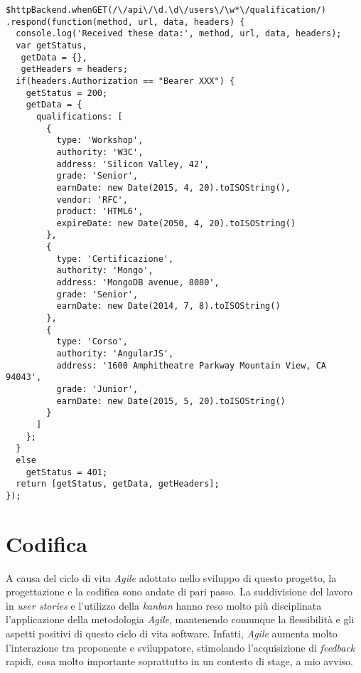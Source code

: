 \begin{verbatim}
$httpBackend.whenGET(/\/api\/\d.\d\/users\/\w*\/qualification/)
.respond(function(method, url, data, headers) {
  console.log('Received these data:', method, url, data, headers);
  var getStatus,
   getData = {},
   getHeaders = headers;
  if(headers.Authorization == "Bearer XXX") {
    getStatus = 200;
    getData = {
      qualifications: [
        {
          type: 'Workshop',
          authority: 'W3C',
          address: 'Silicon Valley, 42',
          grade: 'Senior',
          earnDate: new Date(2015, 4, 20).toISOString(),
          vendor: 'RFC',
          product: 'HTML6',
          expireDate: new Date(2050, 4, 20).toISOString()
        },
        {
          type: 'Certificazione',
          authority: 'Mongo',
          address: 'MongoDB avenue, 8080',
          grade: 'Senior',
          earnDate: new Date(2014, 7, 8).toISOString()
        },
        {
          type: 'Corso',
          authority: 'AngularJS',
          address: '1600 Amphitheatre Parkway Mountain View, CA 94043',
          grade: 'Junior',
          earnDate: new Date(2015, 5, 20).toISOString()
        }
      ]
    };
  }
  else
    getStatus = 401;
  return [getStatus, getData, getHeaders];
});
\end{verbatim} 

\section{Codifica}
A causa del ciclo di vita \emph{Agile} adottato nello sviluppo di questo progetto, la progettazione e la codifica sono andate di pari passo. La suddivisione del lavoro in \emph{user stories} e l'utilizzo della \emph{kanban} hanno reso molto più disciplinata l'applicazione della metodologia \emph{Agile}, mantenendo comunque la flessibilità e gli aspetti positivi di questo ciclo di vita software. Infatti, \emph{Agile} aumenta molto l'interazione tra proponente e sviluppatore, stimolando l'acquisizione di \emph{feedback} rapidi, cosa molto importante soprattutto in un contesto di stage, a mio avviso.

